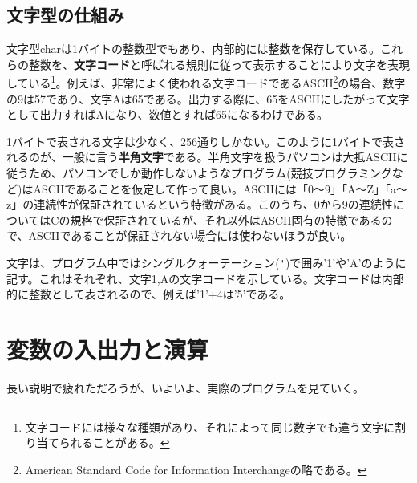 \subsection{文字型の仕組み}
文字型charは1バイトの整数型でもあり、内部的には整数を保存している。これらの整数を、\textbf{文字コード}と呼ばれる規則に従って表示することにより文字を表現している\footnote{文字コードには様々な種類があり、それによって同じ数字でも違う文字に割り当てられることがある。}。例えば、非常によく使われる文字コードであるASCII\footnote{American Standard Code for Information Interchangeの略である。}の場合、数字の9は57であり、文字Aは65である。出力する際に、65をASCIIにしたがって文字として出力すればAになり、数値とすれば65になるわけである。

1バイトで表される文字は少なく、256通りしかない。このように1バイトで表されるのが、一般に言う\textbf{半角文字}である。半角文字を扱うパソコンは大抵ASCIIに従うため、パソコンでしか動作しないようなプログラム(競技プログラミングなど)はASCIIであることを仮定して作って良い。ASCIIには「0〜9」「A〜Z」「a〜z」の連続性が保証されているという特徴がある。このうち、0から9の連続性についてはCの規格で保証されているが、それ以外はASCII固有の特徴であるので、ASCIIであることが保証されない場合には使わないほうが良い。

文字は、プログラム中ではシングルクォーテーション(\verb|'|)で囲み'1'や'A'のように記す。これはそれぞれ、文字1,Aの文字コードを示している。文字コードは内部的に整数として表されるので、例えば'1'+4は'5'である。

\section{変数の入出力と演算}
長い説明で疲れただろうが、いよいよ、実際のプログラムを見ていく。
